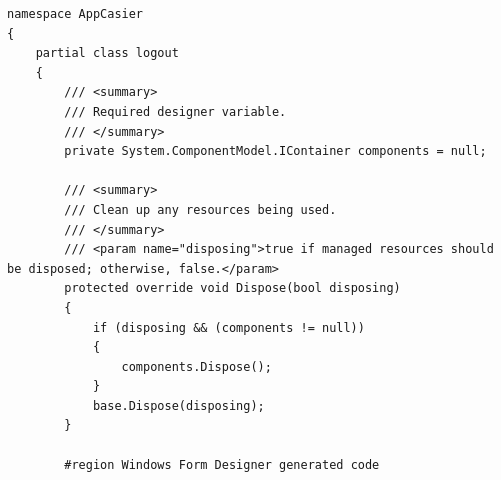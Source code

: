 \documentclass[main.tex]{subfiles}
\begin{document}
\begin{lstlisting}
namespace AppCasier
{
    partial class logout
    {
        /// <summary>
        /// Required designer variable.
        /// </summary>
        private System.ComponentModel.IContainer components = null;

        /// <summary>
        /// Clean up any resources being used.
        /// </summary>
        /// <param name="disposing">true if managed resources should be disposed; otherwise, false.</param>
        protected override void Dispose(bool disposing)
        {
            if (disposing && (components != null))
            {
                components.Dispose();
            }
            base.Dispose(disposing);
        }

        #region Windows Form Designer generated code


\end{lstlisting}
\end{document}
